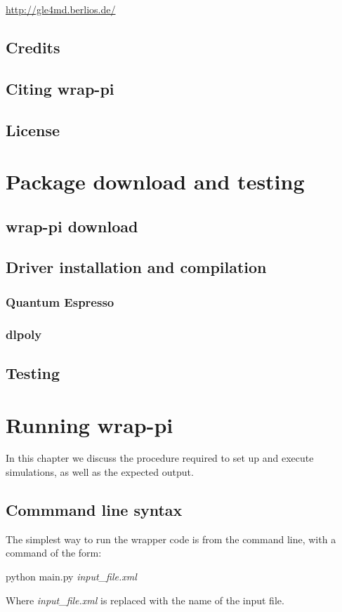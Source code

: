\documentclass[12pt,fleqn]{report}
\begin{document}
\begin{center}
\url{http://gle4md.berlios.de/}
\end{center}
\section{Credits}
\section{Citing wrap-pi}
\section{License}

\chapter{Package download and testing}
\section{wrap-pi download}
\section{Driver installation and compilation}
\subsection{Quantum Espresso}
\subsection{dlpoly}
\section{Testing}

\chapter{Running wrap-pi}
In this chapter we discuss the procedure required to set up and execute 
simulations, as well as the expected output.
\section{Commmand line syntax}
The simplest way to run the wrapper code is from the command line, with a 
command of the form:

\begin{center}
python main.py \emph{input\_file.xml}
\end{center} 
Where \emph{input\_file.xml} is replaced with the name of the input file.
\end{document}
